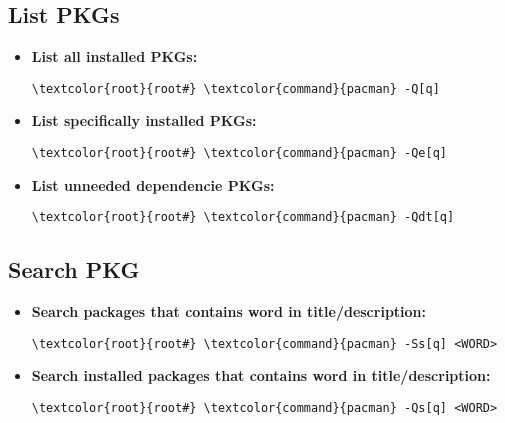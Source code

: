 \documentclass[10pt, a4paper, onecolumn, openany]{book} %
\begin{document}
\subsection{List PKGs}
\begin{itemize}
    \item \textbf{List all installed PKGs:}
\begin{Verbatim}[commandchars=\\\{\}]
\textcolor{root}{root#} \textcolor{command}{pacman} -Q[q]
\end{Verbatim}
    \item \textbf{List specifically installed PKGs:}
\begin{Verbatim}[commandchars=\\\{\}]
\textcolor{root}{root#} \textcolor{command}{pacman} -Qe[q]
\end{Verbatim}
    \item \textbf{List unneeded dependencie PKGs:}
\begin{Verbatim}[commandchars=\\\{\}]
\textcolor{root}{root#} \textcolor{command}{pacman} -Qdt[q]
\end{Verbatim}
\end{itemize}
\subsection{Search PKG}
\begin{itemize}
    \item \textbf{Search packages that contains word in title/description:}
\begin{Verbatim}[commandchars=\\\{\}]
\textcolor{root}{root#} \textcolor{command}{pacman} -Ss[q] <WORD>
\end{Verbatim}
    \item \textbf{Search installed packages that contains word in title/description:}
\begin{Verbatim}[commandchars=\\\{\}]
\textcolor{root}{root#} \textcolor{command}{pacman} -Qs[q] <WORD>
\end{Verbatim} 
\end{itemize}
\end{document}

